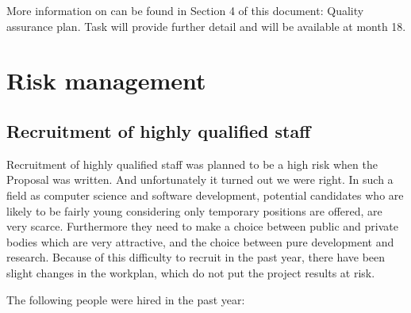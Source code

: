 \documentclass{deliverablereport}
\begin{document}
More information on
 can be found in
Section 4 of this document: Quality assurance plan.
Task  will provide
further detail and will be available at month 18.








\section{Risk management}
\subsection{Recruitment of highly qualified staff}
Recruitment of highly qualified staff was planned to be a high risk
when the Proposal was written. And unfortunately it turned out we were
right. In such a field as computer science and software development,
potential candidates who are likely to be fairly young considering
only temporary positions are offered, are very scarce. Furthermore
they need to make a choice between public and private bodies which are
very attractive, and the choice between pure development and research.
Because of this difficulty to recruit in the past year, there have
been slight changes in the workplan, which do
not put the project results at risk.

The following people were hired in the past year:\\
\end{document}

